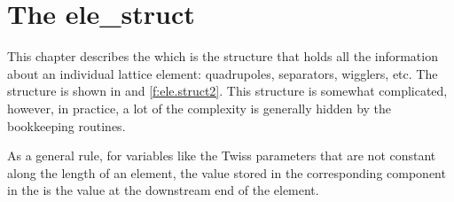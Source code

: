 \chapter{The ele_struct}
\label{c:ele.struct}

This chapter describes the  which is the structure that
holds all the information about an individual lattice element:
quadrupoles, separators, wigglers, etc. The  structure is
shown in   and \ref{f:ele.struct2}. This
structure is somewhat complicated, however, in practice, a lot of the
complexity is generally hidden  by the \bmad bookkeeping routines.

As a general rule, for variables like the Twiss parameters that are not
constant along the length of an element, the value stored in the
corresponding component in the  is the value at the downstream
end of the element.


